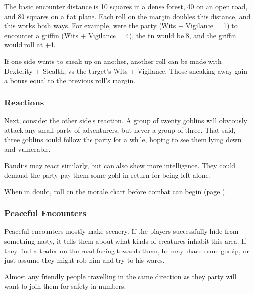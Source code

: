 \begin{multicols}{2}
\begin{rollchart}
\end{rollchart}

The basic encounter distance is 10 squares in a dense forest, 40 on an open road, and 80 squares on a flat plane.
Each roll on the margin doubles this distance, and this works both ways.
For example, were the party (Wits + Vigilance = 1) to encounter a griffin (Wits + Vigilance = 4), the \gls{tn} would be 8, and the griffin would roll at +4.

If one side wants to sneak up on another, another roll can be made with Dexterity + Stealth, vs the target's Wits + Vigilance.
Those sneaking away gain a bonus equal to the previous roll's margin.

\subsubsection{Reactions}


Next, consider the other side's reaction.
A group of twenty goblins will obviously attack any small party of adventurers, but never a group of three.
That said, three goblins could follow the party for a while, hoping to see them lying down and vulnerable.

Bandits may react similarly, but can also show more intelligence.
They could demand the party pay them some gold in return for being left alone.

When in doubt, roll on the morale chart before combat can begin (page \pageref{morale}).

\subsubsection{Peaceful Encounters}

Peaceful encounters mostly make scenery.
If the players successfully hide from something nasty, it tells them about what kinds of creatures inhabit this area.
If they find a trader on the road facing towards them, he may share some gossip, or just assume they might rob him and try to his wares.

Almost any friendly people travelling in the same direction  as they party will want to join them for safety in numbers.

\end{multicols}

